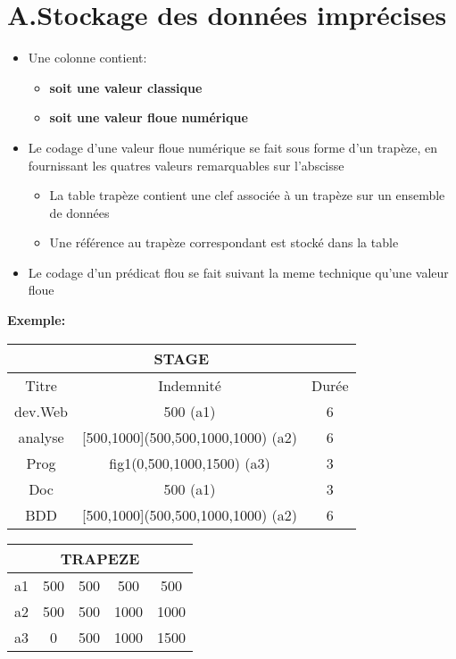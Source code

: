 \documentclass[a4paper,11pt]{article}
\begin{document}
\section{A.Stockage des données imprécises}
\begin{itemize}
\item Une colonne contient:
\begin{itemize}
\item \textbf{soit une valeur classique}
\item \textbf{soit une valeur floue numérique}
\end{itemize}
\item Le codage d'une valeur floue numérique se fait sous forme d'un trapèze, en fournissant les quatres valeurs remarquables sur l'abscisse
\begin{itemize}
\item La table trapèze contient une clef associée à un trapèze sur un ensemble de données
\item Une référence au trapèze correspondant est stocké dans la table
\end{itemize}
\item Le codage d'un prédicat flou se fait suivant la meme technique qu'une valeur floue
\end{itemize}

\textbf{Exemple:}
\begin{center}
\begin{tabular}{|c|c|c|}
\hline
\multicolumn{3}{|c|}{STAGE}\\
\hline 
Titre & Indemnité & Durée \\ 
\hline 
dev.Web & 500 (a1) & 6 \\ 
\hline 
analyse & [500,1000](500,500,1000,1000) (a2) & 6 \\ 
\hline 
Prog & fig1(0,500,1000,1500) (a3) & 3 \\ 
\hline 
Doc & 500 (a1) & 3 \\ 
\hline 
BDD & [500,1000](500,500,1000,1000) (a2) & 6 \\ 
\hline
\end{tabular} 
\end{center}

\begin{center}
\begin{tabular}{|c|c|c|c|c|}
\hline
\multicolumn{5}{|c|}{TRAPEZE}\\
\hline 
a1 & 500 & 500 & 500 & 500 \\ 
\hline 
a2 & 500 & 500 & 1000 & 1000 \\ 
\hline 
a3 & 0 & 500 & 1000 & 1500 \\ 
\hline 
\end{tabular} 
\end{center}
\end{document}
